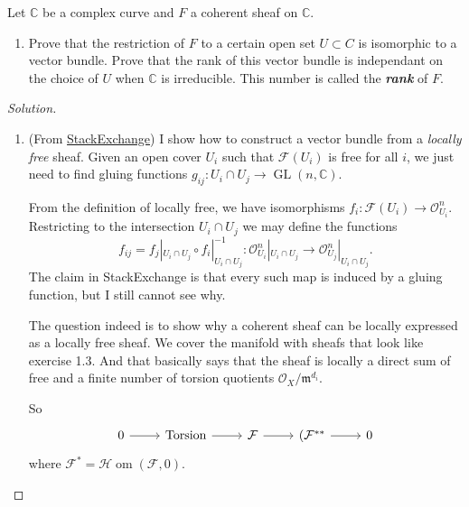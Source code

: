 \begin{manualexercise}{1.8}
	Let $\mathbb{C}$ be a complex curve and $F$ a coherent sheaf on $\mathbb{C}$.
	\begin{enumerate}[label=\alph*.]
		\item Prove that the restriction of $F$ to a certain open set $U\subset C$ is isomorphic to a vector bundle. Prove that the rank of this vector bundle is independant on the choice of $U$ when $\mathbb{C}$ is irreducible. This number is called the \textit{\textbf{rank}} of $F$.
	\end{enumerate}	
\end{manualexercise}

\begin{proof}[Solution]\leavevmode
	\begin{enumerate}[label=\alph*.]
		\item (From \href{https://math.stackexchange.com/questions/2725664/vector-bundle-locally-free-sheaf}{StackExchange}) I show how to construct a vector bundle from a \textit{locally free} sheaf. Given an open cover $U_i$ such that $\mathcal{F}(U_i)$ is free for all $i$, we just need to find gluing functions $g_{ij}:U_i\cap U_j\to \operatorname{GL}(n,\mathbb{C}) $.

		From the definition of locally free, we have isomorphisms $f_i:\mathcal{F}(U_i)\to \mathcal{O}^n_{U_i}$. Restricting to the intersection $U_i\cap U_j$ we may define the functions
	\[f_{ij}=f_j|_{U_i\cap U_j}\circ f_i|_{U_i\cap U_j}^{-1} :\mathcal{O}^n_{U_i}|_{U_i\cap U_j}\to \mathcal{O}^n_{U_j}|_{U_i\cap U_j}.\]
	The claim in StackExchange is that every such map is induced by a gluing function, but I still cannot see why.

	The question indeed is to show why a coherent sheaf can be locally expressed as a locally free sheaf. We cover the manifold with sheafs that look like exercise 1.3. And that basically says that the sheaf is locally a direct sum of free and a finite number of torsion quotients $\mathcal{O}_X/\mathfrak{m}^{d_i}$.

	So
	\[\begin{tikzcd}
		0\arrow[r]&\text{Torsion} \arrow[r]&\mathcal{F}\arrow[r]&(\mathcal{F}^{**}\arrow[r]&0
	\end{tikzcd}\]
	where $\mathcal{F}^* =\mathcal{H}\operatorname{om}(\mathcal{F},0)$.

	\iffalse\begin{remark}
		(\href{https://math.stackexchange.com/questions/2597356/vector-bundle-associated-to-a-locally-free-sheaf}{StackExchange}) The equivalence of the categories of vector bundles and locally free sheaves is given by the functor
		\[\mathcal{E}\mapsto \operatorname{Spec}(\operatorname{Sym}(\mathcal{E})),\quad E\mapsto \Gamma^\vee_{E/X^\bullet}\]
	\end{remark}\fi
	\end{enumerate}
\end{proof}

\printbibliography


